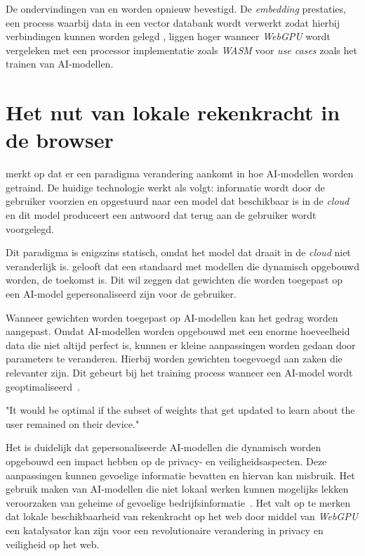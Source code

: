 \bigbreak{}

De ondervindingen van \textcite{Wallez2023} en \textcite{Radin2021} worden opnieuw bevestigd. De \textit{embedding} prestaties, een process waarbij data in een vector databank wordt verwerkt zodat hierbij verbindingen kunnen worden gelegd \autocite{Cloudflare2024, Cloudflare2024a, Huyen2023}, liggen hoger wanneer \textit{WebGPU} wordt vergeleken met een processor implementatie zoals \textit{WASM} voor \textit{use cases} zoals het trainen van AI-modellen.

\break{}

\section{Het nut van lokale rekenkracht in de browser} 

\textcite{Fleetwood2022} merkt op dat er een paradigma verandering aankomt in hoe AI-modellen worden getraind. De huidige technologie werkt als volgt: informatie wordt door de gebruiker voorzien en opgestuurd naar een model dat beschikbaar is in de \textit{cloud} en dit model produceert een antwoord dat terug aan de gebruiker wordt voorgelegd.

\bigbreak{}

Dit paradigma is enigszins statisch, omdat het model dat draait in de \textit{cloud} niet veranderlijk is. \textcite{Fleetwood2022} gelooft dat een standaard met modellen die dynamisch opgebouwd worden, de toekomst is. Dit wil zeggen dat gewichten die worden toegepast op een AI-model gepersonaliseerd zijn voor de gebruiker. 

\bigbreak{}

Wanneer gewichten worden toegepast op AI-modellen kan het gedrag worden aangepast. Omdat AI-modellen worden opgebouwd met een enorme hoeveelheid data die niet altijd perfect is, kunnen er kleine aanpassingen worden gedaan door parameters te veranderen. Hierbij worden gewichten toegevoegd aan zaken die relevanter zijn. Dit gebeurt bij het training process wanneer een AI-model wordt geoptimaliseerd~\autocite{Hubbard2024}.

\begin{displayquote}
    "It would be optimal if the subset of weights that get updated to learn about the user remained on their device."
\end{displayquote}

Het is duidelijk dat gepersonaliseerde AI-modellen die dynamisch worden opgebouwd een impact hebben op de privacy- en veiligheidsaspecten. Deze aanpassingen kunnen gevoelige informatie bevatten en hiervan kan misbruik. Het gebruik maken van AI-modellen die niet lokaal werken kunnen mogelijks lekken veroorzaken van geheime of gevoelige bedrijfsinformatie~\autocite{Wiggers2023, Sabin2023}. Het valt op te merken dat lokale beschikbaarheid van rekenkracht op het web door middel van \textit{WebGPU} een katalysator kan zijn voor een  revolutionaire verandering in privacy en veiligheid op het web.

